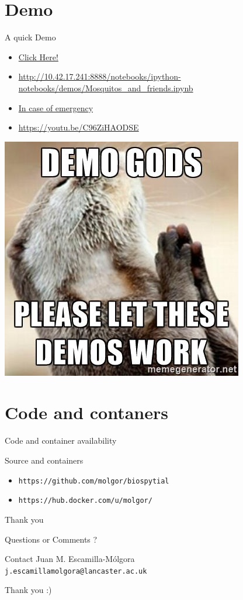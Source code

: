 \documentclass{beamer}
\begin{document}
\section{Demo}
\begin{frame}
\begin{block}{A quick Demo}
\begin{itemize}
\item \href{http://10.42.17.241:8888/notebooks/ipython-notebooks/demos/Mosquitos_and_friends.ipynb}{Click Here!}
\item \url{http://10.42.17.241:8888/notebooks/ipython-notebooks/demos/Mosquitos\_and\_friends.ipynb}
\item \href{https://youtu.be/C96ZiHAODSE}{In case of emergency}
\item \url{https://youtu.be/C96ZiHAODSE}
\end{itemize}
\end{block}
\centering
\includegraphics[scale=0.4]{please-demo-gods.jpg}
\end{frame}
\section{Code and contaners}

\begin{frame}{Code and container availability}
\begin{block}{Source and containers}
\begin{itemize}
\item {\tt https://github.com/molgor/biospytial}
\item {\tt https://hub.docker.com/u/molgor/ }
\end{itemize}
\end{block}
\end{frame}




\begin{frame}{Thank you}
\begin{block}{}
Questions or Comments ?
\end{block}
\begin{block}{Contact}
Juan M. Escamilla-M\'olgora \\
{\tt j.escamillamolgora@lancaster.ac.uk}
\end{block}
Thank you :)
\end{frame}
\end{document}
